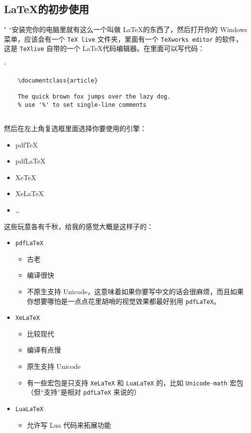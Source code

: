 \subsection{\LaTeX 的初步使用}
"
“安装完你的电脑里就有这么一个叫做 \LaTeX 的东西了，然后打开你的 Windows 菜单，应该会有一个 \verb"TeX live" 文件夹，里面有一个 \verb"TeXworks editor" 的软件，这是 \verb"TeXlive" 自带的一个 \LaTeX 代码编辑器。在里面可以写代码：

`

\begin{lstlisting}
    \documentclass{article}
    
    The quick brown fox jumps over the lazy dog.
    % use '%' to set single-line comments
    
\end{lstlisting}

然后在左上角复选框里面选择你要使用的引擎：

\begin{itemize}\ttfamily
    \item pdfTeX
    \item pdfLaTeX
    \item XeTeX
    \item XeLaTeX
    \item \dots
\end{itemize}

这些玩意各有千秋，给我的感觉大概是这样子的：
\begin{itemize}
    \item \verb"pdfLaTeX"
          \begin{itemize}
              \item 古老
              \item 编译很快
              \item 不原生支持 Unicode，这意味着如果你要写中文的话会很麻烦，而且如果你想要哪怕是一点点花里胡哨的视觉效果都最好别用 \verb"pdfLaTeX"。
          \end{itemize}
    \item \verb"XeLaTeX"
          \begin{itemize}
              \item 比较现代
              \item 编译有点慢
              \item 原生支持 Unicode
              \item 有一些宏包是只支持 \verb"XeLaTeX" 和 \verb"LuaLaTeX" 的，比如 \verb"Unicode-math" 宏包（但“支持”是相对 \verb"pdfLaTeX" 来说的）
          \end{itemize}
    \item \verb"LuaLaTeX"
          \begin{itemize}
              \item 允许写 Lua 代码来拓展功能
          \end{itemize}
\end{itemize}

